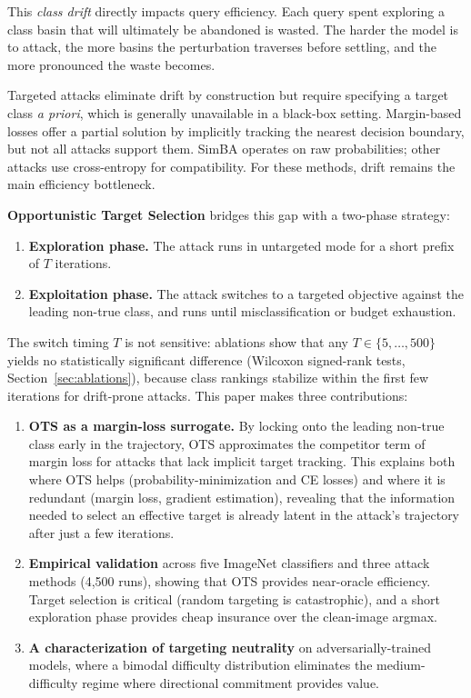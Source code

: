 \documentclass{cap2026}
\begin{document}
This \textit{class drift} directly impacts query efficiency. Each query spent exploring a class basin that will ultimately be abandoned is wasted. The harder the model is to attack, the more basins the perturbation traverses before settling, and the more pronounced the waste becomes.

Targeted attacks eliminate drift by construction but require specifying a target class \textit{a priori}, which is generally unavailable in a black-box setting. Margin-based losses \citep{carlini2017towards} offer a partial solution by implicitly tracking the nearest decision boundary, but not all attacks support them. SimBA operates on raw probabilities; other attacks use cross-entropy for compatibility. For these methods, drift remains the main efficiency bottleneck.

\textbf{Opportunistic Target Selection} bridges this gap with a two-phase strategy:
\begin{enumerate}
    \item \textbf{Exploration phase.} The attack runs in untargeted mode for a short prefix of $T$ iterations.
    \item \textbf{Exploitation phase.} The attack switches to a targeted objective against the leading non-true class, and runs until misclassification or budget exhaustion.
\end{enumerate}

The switch timing $T$ is not sensitive: ablations show that any $T \in \{5, \ldots, 500\}$ yields no statistically significant difference (Wilcoxon signed-rank tests, Section~\ref{sec:ablations}), because class rankings stabilize within the first few iterations for drift-prone attacks. This paper makes three contributions:

\begin{enumerate}
    \item \textbf{OTS as a margin-loss surrogate.} By locking onto the leading non-true class early in the trajectory, OTS approximates the competitor term of margin loss for attacks that lack implicit target tracking. This explains both where OTS helps (probability-minimization and CE losses) and where it is redundant (margin loss, gradient estimation), revealing that the information needed to select an effective target is already latent in the attack's trajectory after just a few iterations.
    \item \textbf{Empirical validation} across five ImageNet classifiers and three attack methods (4,500 runs), showing that OTS provides near-oracle efficiency. Target selection is critical (random targeting is catastrophic), and a short exploration phase provides cheap insurance over the clean-image argmax.
    \item \textbf{A characterization of targeting neutrality} on adversarially-trained models, where a bimodal difficulty distribution eliminates the medium-difficulty regime where directional commitment provides value.
\end{enumerate}
\end{document}
